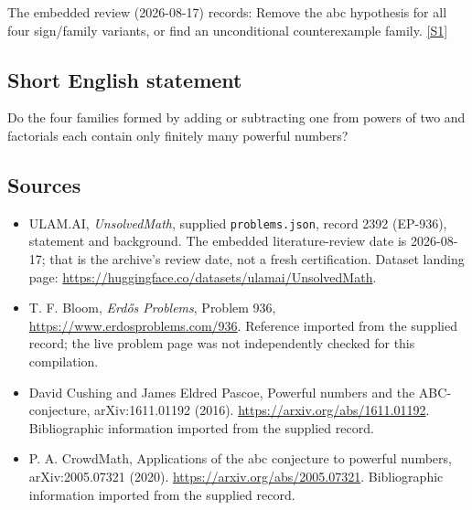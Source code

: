 \documentclass[11pt,a4paper]{article}
\newcommand{\sref}[2]{\hyperlink{source:#1:#2}{[S#2]}}
\begin{document}
The embedded review (2026-08-17) records: Remove the abc hypothesis for all four sign/family variants, or find an unconditional counterexample family. \sref{2392}{1}

\subsection{Short English statement}

Do the four families formed by adding or subtracting one from powers of two and factorials each contain only finitely many powerful numbers?

\subsection{Sources}

{\small

\begin{itemize}

\item[\hypertarget{source:2392:1}{S1}] ULAM.AI, \emph{UnsolvedMath}, supplied \texttt{problems.json}, record 2392 (EP-936), statement and background. The embedded literature-review date is 2026-08-17; that is the archive’s review date, not a fresh certification. Dataset landing page: \url{https://huggingface.co/datasets/ulamai/UnsolvedMath}.

\item[\hypertarget{source:2392:2}{S2}] T. F. Bloom, \emph{Erdős Problems}, Problem 936, \url{https://www.erdosproblems.com/936}. Reference imported from the supplied record; the live problem page was not independently checked for this compilation.

\item[\hypertarget{source:2392:3}{S3}] David Cushing and James Eldred Pascoe, Powerful numbers and the ABC-conjecture, arXiv:1611.01192 (2016). \url{https://arxiv.org/abs/1611.01192}. Bibliographic information imported from the supplied record.

\item[\hypertarget{source:2392:4}{S4}] P. A. CrowdMath, Applications of the abc conjecture to powerful numbers, arXiv:2005.07321 (2020). \url{https://arxiv.org/abs/2005.07321}. Bibliographic information imported from the supplied record.

\end{itemize}

}

\label{end:2392}
\end{document}

